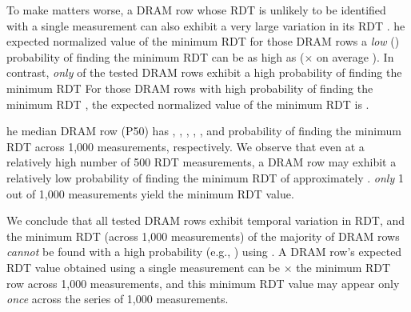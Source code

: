 
To make matters worse, a DRAM row whose RDT is unlikely to be identified with a
single measurement can also exhibit a very large variation in its RDT . he expected
normalized value of the minimum RDT for those DRAM rows  a
\emph{low} () probability of finding the minimum RDT can
be as high as   ($\times{}$ on average ). In contrast, \emph{only}  of the tested DRAM rows
exhibit a high probability of finding the minimum RDT 
 For those DRAM
rows with  high probability of finding the minimum RDT , the expected normalized value of the minimum
RDT is  
. 


he median DRAM row
(P50) has , ,
, , ,
and  probability of finding the minimum RDT across
1,000 measurements, respectively. We observe that even at a relatively high
number of  500 RDT measurements, a DRAM row may exhibit a
relatively low probability of finding the minimum RDT of approximately
 .  \emph{only} 1
out of 1,000 measurements yield the minimum RDT value.

We conclude that all tested DRAM rows exhibit temporal variation in
RDT, and the minimum RDT (across 1,000 measurements) of the majority of DRAM
rows \emph{cannot} be found with a high probability (e.g., )
using . A DRAM row's expected RDT value obtained using a single measurement can be
$\times{}$ the minimum RDT  row across
1,000 measurements, and this minimum RDT value may appear only \emph{once}
across the series of 1,000 measurements.

